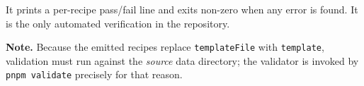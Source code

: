 It prints a per-recipe pass/fail line and exits non-zero when any error is found.
It is the only automated verification in the repository.

\textbf{Note.} Because the emitted recipes replace \texttt{templateFile} with
\texttt{template}, validation must run against the \emph{source} data directory;
the validator is invoked by \texttt{pnpm validate} precisely for that reason.
